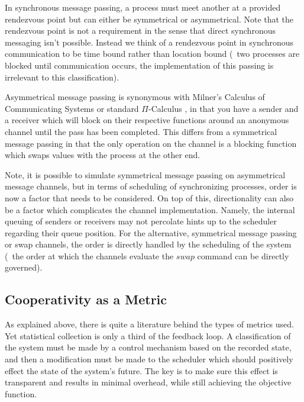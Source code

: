 In synchronous message passing, a process must meet another at a provided rendezvous point but can either be symmetrical
or asymmetrical. Note that the rendezvous point is not a requirement in the sense that direct synchronous messaging isn't 
possible. Instead we think of a rendezvous point in synchronous communication to be time bound rather than location bound (\ie~two
processes are blocked until communication occurs, the implementation of this passing is irrelevant to this 
classification).

Asymmetrical message passing is synonymous with Milner's Calculus of Communicating Systems \cite{milner1982calculus} 
or standard $\Pi$-Calculus \cite{palamidessi1997comparing}, in that you have a sender and a receiver which will 
block on their respective functions around an anonymous channel until the pass has been completed. This differs from a 
symmetrical message passing in that the only operation on the channel is a blocking function which swaps values 
with the process at the other end.

Note, it is possible to simulate symmetrical message passing on asymmetrical message channels, but in terms of scheduling of
synchronizing processes, order is now a factor that needs to be considered. On top of this, directionality can also be a factor
which complicates the channel implementation. Namely, the internal queuing of senders or receivers may not percolate hints up to
the scheduler regarding their queue position. For the alternative, symmetrical message passing or swap channels, the order is
directly handled by the scheduling of the system (\ie~the order at which the channels evaluate the $swap$ command can be 
directly governed).

\subsection{Cooperativity as a Metric}


As explained above, there is quite a literature behind the types of metrics used. Yet statistical collection is 
only a third of the feedback loop. A classification of the system must be made by a control mechanism based on the 
recorded state, and then a modification must be made to the scheduler which should positively 
effect the state of the system's future. The key is to make sure this effect is transparent and results in minimal
overhead, while still achieving the objective function.

